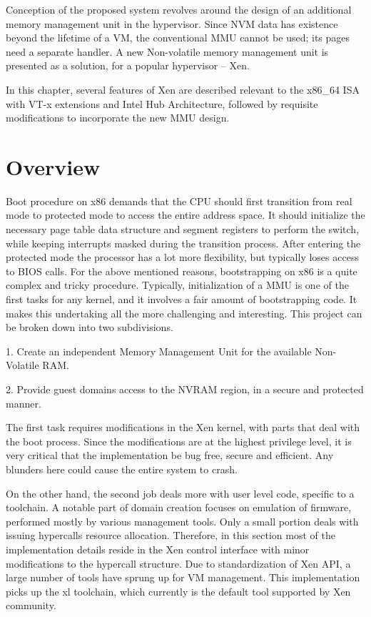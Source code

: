 Conception of the proposed system revolves around the design of an additional memory management unit in the hypervisor. Since NVM data has existence beyond the lifetime of a VM, the conventional MMU cannot be used; its pages need a separate handler. A new Non-volatile memory management unit is presented as a solution, for a popular hypervisor -- Xen.  

In this chapter, several features of Xen are described relevant to the x86\_64 ISA with VT-x extensions and Intel Hub Architecture, followed by requisite modifications to incorporate the new MMU design. 

\section{Overview}

Boot procedure on x86 demands that the CPU should first transition from real mode to protected mode to access the entire address space. It should initialize the necessary page table data structure and segment registers to perform the switch, while keeping interrupts masked during the transition process. After entering the protected mode the processor has a lot more flexibility, but typically loses access to BIOS calls. For the above mentioned reasons, bootstrapping on x86 is a quite complex and tricky procedure. Typically, initialization of a MMU is one of the first tasks for any kernel, and it involves a fair amount of bootstrapping code. It makes this undertaking all the more challenging and interesting. This project can be broken down into two subdivisions. 

1. Create an independent Memory Management Unit for the available Non-Volatile RAM. 

2. Provide guest domains access to the NVRAM region, in a secure and protected manner. 

The first task requires modifications in the Xen kernel, with parts that deal with the boot process. Since the modifications are at the highest privilege level, it is very critical that the implementation be bug free, secure and efficient. Any blunders here could cause the entire system to crash.  

On the other hand, the second job deals more with user level code, specific to a toolchain. A notable part of domain creation focuses on emulation of firmware, performed mostly by various management tools. Only a small portion deals with issuing hypercalls resource allocation. Therefore, in this section most of the implementation details reside in the Xen control interface with minor modifications to the hypercall structure. Due to standardization of Xen API, a large number of tools have sprung up for VM management. This implementation picks up the xl toolchain, which currently is the default tool supported by Xen community. 

